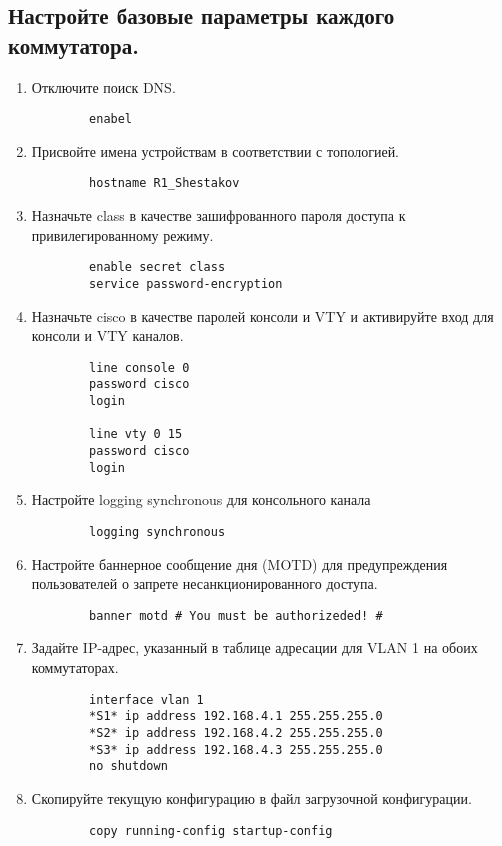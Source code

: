 \subsection{Настройте базовые параметры каждого коммутатора.}
\begin{enumerate}[a]
    \item Отключите поиск DNS\@.
    \begin{verbatim}
        enabel
    \end{verbatim}

    \item Присвойте имена устройствам в соответствии с топологией.
    \begin{verbatim}
        hostname R1_Shestakov
    \end{verbatim}

    \item Назначьте class в качестве зашифрованного пароля доступа к привилегированному режиму.
    \begin{verbatim}
        enable secret class
        service password-encryption
    \end{verbatim}

    \item Назначьте cisco в качестве паролей консоли и VTY и активируйте вход для консоли и VTY каналов.
    \begin{verbatim}
        line console 0
        password cisco
        login

        line vty 0 15
        password cisco
        login
    \end{verbatim}

    \item Настройте logging synchronous для консольного канала
    \begin{verbatim}
        logging synchronous
    \end{verbatim}

    \item Настройте баннерное сообщение дня (MOTD) для предупреждения пользователей о запрете
    несанкционированного доступа.
    \begin{verbatim}
        banner motd # You must be authorizeded! #
    \end{verbatim}

    \item Задайте IP-адрес, указанный в таблице адресации для VLAN 1 на обоих коммутаторах.
    \begin{verbatim}
        interface vlan 1
        *S1* ip address 192.168.4.1 255.255.255.0
        *S2* ip address 192.168.4.2 255.255.255.0
        *S3* ip address 192.168.4.3 255.255.255.0
        no shutdown
    \end{verbatim}

    \item Скопируйте текущую конфигурацию в файл загрузочной конфигурации.
    \begin{verbatim}
        copy running-config startup-config
    \end{verbatim}
\end{enumerate}

